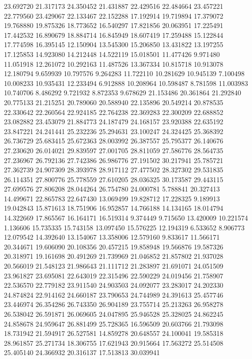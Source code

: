 23.692720
21.317173
24.350452
21.431887
22.429516
22.484664
23.457221
22.779560
23.429067
22.133467
22.152288
17.192914
19.719894
17.379072
19.768880
19.875326
18.773652
16.540297
17.821856
20.063951
17.225491
17.442532
16.890679
18.884714
16.845949
18.607419
17.259488
15.122844
17.774598
16.395145
12.150904
13.545300
15.206850
13.431822
13.197255
17.125853
14.923080
14.212448
14.522119
15.018501
11.477426
9.971480
11.051918
12.261072
10.292163
11.487526
13.367334
10.815718
10.913078
12.180794
9.659939
10.797576
9.264283
11.722110
10.281629
10.945139
7.100498
10.008233
10.935431
12.233494
6.912888
10.208964
10.598487
8.781598
11.003983
10.740706
8.486292
9.721932
8.872353
9.678629
21.153486
20.361864
21.292840
20.775133
21.215251
20.789060
20.588940
22.135896
20.549214
20.878535
22.330642
22.260564
22.924185
22.764238
22.369283
22.300209
22.688852
23.082882
23.453079
21.884773
24.187479
24.168157
23.920388
22.635192
23.847221
24.241441
25.232236
25.294631
23.100247
24.324425
25.368392
26.736729
25.683415
25.672363
28.003992
26.387557
25.795377
26.140676
27.230620
26.014021
29.839597
27.001705
28.811059
27.586776
28.564735
27.236967
26.792136
27.742386
26.986776
27.191502
30.217941
25.785721
27.362739
24.907309
28.393978
28.917112
27.477502
28.327302
29.531835
26.114351
27.800776
25.778559
27.610205
28.036325
30.173587
29.443115
27.699576
27.806208
28.044264
26.754780
24.000781
5.788841
20.327413
14.499671
22.865783
22.647430
13.069499
19.828712
17.228325
9.189913
19.042843
15.871613
18.751906
16.952857
14.766188
14.134165
18.014794
14.322669
17.865567
16.164171
16.519314
9.374449
9.715650
13.420009
10.221574
1.136606
15.735335
15.743158
13.097450
15.576225
12.194319
6.533652
8.906773
12.079542
14.392640
13.154067
13.358006
12.579160
9.833617
11.566171
20.344671
19.606090
20.108356
20.457215
19.858948
19.566876
19.587326
20.318971
19.161698
20.491269
21.739969
21.046852
21.857802
21.937028
20.566019
21.548123
21.986643
21.111712
21.283897
21.691071
24.051509
23.961827
23.695081
22.643019
22.315496
22.590229
24.019456
21.758907
22.536570
22.779182
23.911540
24.903503
24.092077
23.283017
24.202330
24.874824
22.914162
24.660187
23.790653
24.744989
24.391613
25.457746
23.446974
26.354286
26.743350
26.904189
23.755714
25.213263
26.958278
26.538042
26.591871
26.069605
24.047895
25.946528
25.328025
24.862245
24.858678
24.959647
26.881499
25.728365
16.596509
20.603766
21.793098
18.731942
21.594917
26.527581
14.859278
20.648557
24.100041
19.585318
28.961857
25.271734
18.306755
17.621943
20.915664
17.563272
25.514508
25.405140
24.366932
20.316137
17.513813
30.039941
